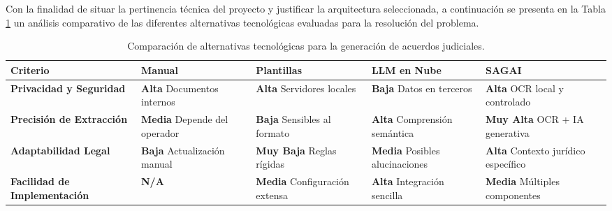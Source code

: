 Con la finalidad de situar la pertinencia técnica del proyecto y justificar la arquitectura seleccionada, a continuación se presenta en la Tabla \ref{tab:comparativa_estado_practica} un análisis comparativo de las diferentes alternativas tecnológicas evaluadas para la resolución del problema.
\begin{table}[H]
    \centering
    \caption{Comparación de alternativas tecnológicas para la generación de acuerdos judiciales.}
    \label{tab:comparativa_estado_practica}
    \small
    \begin{tabular}{|p{2.8cm}|p{2.7cm}|p{2.7cm}|p{2.7cm}|p{3.0cm}|}
        \hline
        \textbf{Criterio} &
        \textbf{Manual} &
        \textbf{Plantillas} &
        \textbf{LLM en Nube} &
        \textbf{SAGAI} \\
        \hline
        
        \textbf{Privacidad y Seguridad} &
        \textbf{Alta} \newline Documentos internos &
        \textbf{Alta} \newline Servidores locales &
        \textbf{Baja} \newline Datos en terceros &
        \textbf{Alta} \newline OCR local y controlado \\
        \hline
        
        \textbf{Precisión de Extracción} &
        \textbf{Media} \newline Depende del operador &
        \textbf{Baja} \newline Sensibles al formato &
        \textbf{Alta} \newline Comprensión semántica &
        \textbf{Muy Alta} \newline OCR + IA generativa \\
        \hline
        
        \textbf{Adaptabilidad Legal} &
        \textbf{Baja} \newline Actualización manual &
        \textbf{Muy Baja} \newline Reglas rígidas &
        \textbf{Media} \newline Posibles alucinaciones &
        \textbf{Alta} \newline Contexto jurídico específico \\
        \hline
        
        \textbf{Facilidad de Implementación} &
        \textbf{N/A} &
        \textbf{Media} \newline Configuración extensa &
        \textbf{Alta} \newline Integración sencilla &
        \textbf{Media} \newline Múltiples componentes \\
        \hline
        

\end{tabular}
\end{table}
